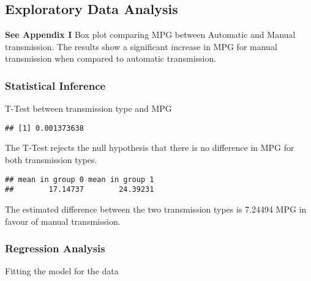 \documentclass[]{article}
\newenvironment{Shaded}{\begin{snugshade}}{\end{snugshade}}
\newcommand{\KeywordTok}[1]{\textcolor[rgb]{0.13,0.29,0.53}{\textbf{#1}}}
\newcommand{\StringTok}[1]{\textcolor[rgb]{0.31,0.60,0.02}{#1}}
\newcommand{\OperatorTok}[1]{\textcolor[rgb]{0.81,0.36,0.00}{\textbf{#1}}}
\newcommand{\NormalTok}[1]{#1}
\begin{document}
\subsection{Exploratory Data Analysis}\label{exploratory-data-analysis}

\textbf{See Appendix I} Box plot comparing MPG between Automatic and
Manual transmission. The results show a significant increase in MPG for
manual transmission when compared to automatic transmission.

\subsubsection{Statistical Inference}\label{statistical-inference}

T-Test between transmission type and MPG

\begin{Shaded}
\end{Shaded}

\begin{verbatim}
## [1] 0.001373638
\end{verbatim}

The T-Test rejects the null hypothesis that there is no difference in
MPG for both transmission types.

\begin{Shaded}
\end{Shaded}

\begin{verbatim}
## mean in group 0 mean in group 1 
##        17.14737        24.39231
\end{verbatim}

The estimated difference between the two transmission types is 7.24494
MPG in favour of manual transmission.

\subsubsection{Regression Analysis}\label{regression-analysis}

Fitting the model for the data
\end{document}
